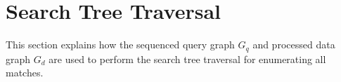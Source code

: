 \section{Search Tree Traversal}\label{DFS-T}
This section explains how the sequenced query graph $G_q$ and processed data graph $G_d$ are used to perform the search tree traversal for enumerating all matches.

